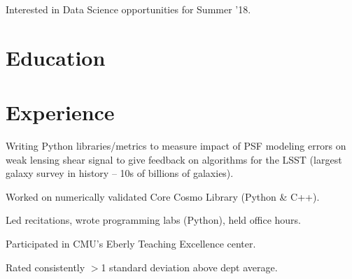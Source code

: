 \documentclass[]{deedy-resume-openfont}
\begin{document}
\hfill
\begin{minipage}[t]{0.66\textwidth} 

\vfill\vfill
$\;$
\vfill

\Large{Interested in Data Science opportunities for Summer '18.}

\section{\color{Blue} Education} 

 \hfill {}

\sectionsep

 \hfill {}
\sectionsep


\section{\color{Blue} Experience}

 \hfill {}

\begin{tightemize} \item Writing Python libraries/metrics to measure impact of PSF modeling errors on weak lensing shear signal to give feedback on algorithms for the LSST (largest galaxy survey in history -- 10s of billions of galaxies). \item Worked on numerically validated Core Cosmo Library (Python \& C++).
\end{tightemize}
\sectionsep



\begin{tightemize}\item Led recitations, wrote programming labs (Python), held office hours.
\item Participated in CMU's Eberly Teaching Excellence center. \item Rated consistently $>$1 standard deviation above dept average.
\end{tightemize}
\sectionsep


\end{minipage}
\end{document}
